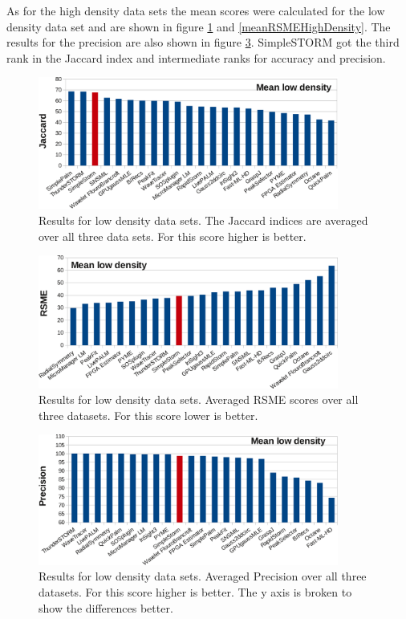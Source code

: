 As for the high density data sets the mean scores were calculated for the low density data set and are shown in figure \ref{meanJaccardLowDensity} and \ref{meanRSMEHighDensity}. The results for the precision are also shown in figure \ref{meanPrecisionLowDensity}. SimpleSTORM got the third rank in the Jaccard index and intermediate ranks for accuracy and precision.

\begin{figure}
\centering
\includegraphics[width = 0.88\textwidth]{pictures/diagrammsChallenge/MeanLowDensityJaccardCropped.pdf}
	\caption{Results for low density data sets. The Jaccard indices are averaged over all three data sets. For this score higher is better.}
	\label{meanJaccardLowDensity}
\end{figure}

\begin{figure}
\centering
\includegraphics[width = 0.88\textwidth]{pictures/diagrammsChallenge/MeanLowDensityRSMECropped.pdf}
	\caption{Results for low density data sets. Averaged RSME scores over all three datasets. For this score lower is better.}
	\label{meanRSMELowDensity}
\end{figure}

\begin{figure}
\centering
\includegraphics[width = 0.88\textwidth]{pictures/diagrammsChallenge/MeanLowDensityPrecisionCropped.pdf}
	\caption{Results for low density data sets. Averaged Precision over all three datasets. For this score higher is better. The y axis is broken to show the differences better.}
	\label{meanPrecisionLowDensity}
\end{figure}

